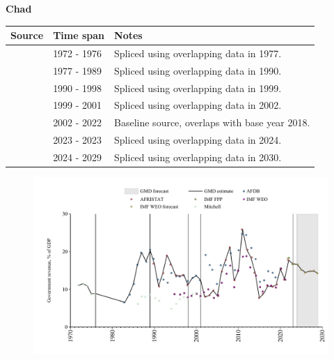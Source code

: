\documentclass[12pt,a4paper,landscape]{article}
\begin{document}
\begin{adjustbox}{max totalsize={\paperwidth}{\paperheight},center}
\begin{minipage}[t][\textheight][t]{\textwidth}
\vspace*{0.5cm}
{}
\begin{center}
{\Large\bfseries Chad}
\end{center}
\vspace{0.5cm}
\begin{table}[H]
\centering
\small
\begin{tabular}{|l|l|l|}
\hline
\textbf{Source} & \textbf{Time span} & \textbf{Notes} \\
\hline
\rowcolor{white}\cite{Mitchell}& 1972 - 1976 &Spliced using overlapping data in 1977.\\
\rowcolor{lightgray}\cite{AFDB}& 1977 - 1989 &Spliced using overlapping data in 1990.\\
\rowcolor{white}\cite{AFRISTAT}& 1990 - 1998 &Spliced using overlapping data in 1999.\\
\rowcolor{lightgray}\cite{AFDB}& 1999 - 2001 &Spliced using overlapping data in 2002.\\
\rowcolor{white}\cite{AFRISTAT}& 2002 - 2022 &Baseline source, overlaps with base year 2018.\\
\rowcolor{lightgray}\cite{IMF_FPP}& 2023 - 2023 &Spliced using overlapping data in 2024.\\
\rowcolor{white}\cite{IMF_WEO_forecast}& 2024 - 2029 &Spliced using overlapping data in 2030.\\
\hline
\end{tabular}
\end{table}
\begin{figure}[H]
\centering
\includegraphics[width=\textwidth,height=0.6\textheight,keepaspectratio]{graphs/TCD_govrev_GDP.pdf}
\end{figure}
\end{minipage}
\end{adjustbox}
\end{document}
